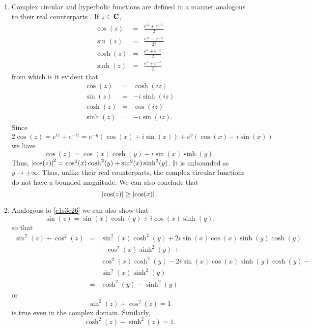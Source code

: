 \begin{enumerate}
\item Complex circular and hyperbolic functions are defined in a manner 
analogous to their real counterparts \cite{aw}. If $z \in \mathbf{C}$,
\begin{eqnarray}
\cos(z) &=& \frac{e^{iz} + e^{-iz}}{2} \label{c1s3e18} \\
\sin(z) &=& \frac{e^{iz} - e^{-iz}}{2i} \label{c1s3e19} \\
\cosh(z) &=& \frac{e^{z} + e^{-z}}{2} \label{c1s3e20} \\
\sinh(z) &=& \frac{e^{z} + e^{-z}}{2} \label{c1s3e21}
\end{eqnarray}
from which is it evident that
\begin{eqnarray}
\cos(z) &=& \cosh(iz) \label{c1s3e22} \\
\sin(z) &=& -i\sinh(iz) \label{c1s3e23} \\
\cosh(z) &=& \cos(iz) \label{c1s3e24} \\
\sinh(z) &=& -i\sin(iz). \label{c1s3e25}
\end{eqnarray}
Since 
\[
2\cos(z) = e^{iz} + e^{-iz} = e^{-y}(\cos(x) + i\sin(x)) + e^{y}
(\cos(x) - i\sin(x))
\]
we have
\begin{equation}\label{c1s3e26}
\cos(z) = \cos(x)\cosh(y) - i\sin(x)\sinh(y).
\end{equation}
Thus, $\left\vert{\cos(z)}\right\vert^2 = \cos^2(x)\cosh^2(y) + \sin^2(x)\sinh^2(y)$. It is
unbounded as $y \rightarrow \pm\infty$. Thus, unlike their real counterparts,
the complex circular functions do not have a bounded magnitude. We can also
conclude that
\begin{equation}\label{c1s3e27}
\left\vert{\cos(z)}\right\vert \ge \left\vert{\cos(x)}\right\vert.
\end{equation}

\item Analogous to \eqref{c1s3e26} we can also show that
\begin{equation}\label{c1s3e28}
\sin(z) = \sin(x)\cosh(y) + i\cos(x)\sinh(y).
\end{equation}
so that
\begin{eqnarray*}
\sin^2(z) + \cos^2(z) &=& 
 \sin^2(x)\cosh^2(y) + 2i\sin(x)\cos(x)\sinh(y)\cosh(y) \\
 & & - \cos^2(x)\sinh^2(y) + \\
 & & \cos^2(x)\cosh^2(y) - 2i\sin(x)\cos(x)\sinh(y)\cosh(y)- \\
 & & \sin^2(x)\sinh^2(y) \\
 &=& \cosh^2(y) - \sinh^2(y)
\end{eqnarray*}
or
\begin{equation}\label{c1s3e29}
\sin^2(z) + \cos^2(z) = 1
\end{equation}
is true even in the complex domain. Similarly,
\begin{equation}\label{c1s3e30}
\cosh^2(z) - \sinh^2(z) = 1.
\end{equation}


\end{enumerate}
